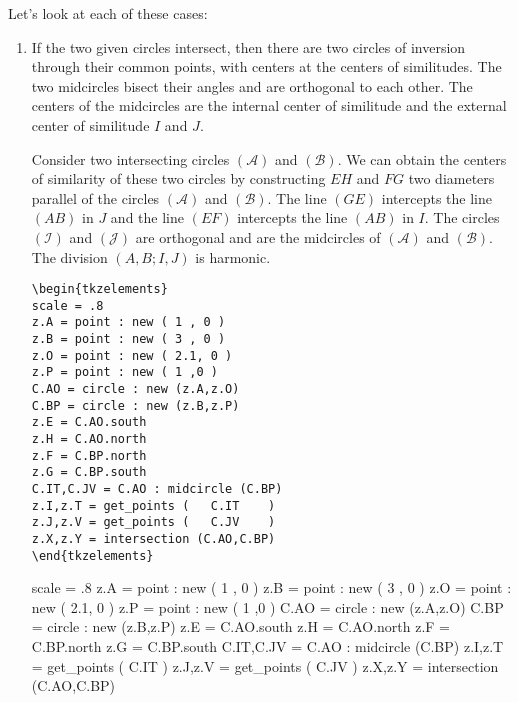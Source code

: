 Let's look at each of these cases:
\begin{enumerate}[label=(\roman*)]
\item If the two given circles intersect, then there are two  circles of inversion through their common points, with centers at the centers of similitudes.  The two midcircles bisect their angles and are orthogonal to each other. The centers of the midcircles are the internal center of similitude and the external center of similitude $I$ and $J$.

Consider two intersecting circles $(\mathcal{A})$ and $(\mathcal{B})$.
We can obtain the centers of similarity of these two circles by constructing $EH$ and $FG$ two diameters parallel of the circles $(\mathcal{A})$ and $(\mathcal{B})$. The  line $(GE)$ intercepts  the line $(AB)$ in $J$ and the line $(EF)$ intercepts the line $(AB)$ in $I$. The circles $(\mathcal{I})$ and $(\mathcal{J})$ are orthogonal and are the midcircles of $(\mathcal{A})$ and $(\mathcal{B})$. The division $(A,B;I,J)$ is harmonic.

\begin{minipage}{.4\textwidth}
\begin{verbatim}
\begin{tkzelements}
scale = .8
z.A = point : new ( 1 , 0 ) 
z.B = point : new ( 3 , 0 ) 
z.O = point : new ( 2.1, 0 ) 
z.P = point : new ( 1 ,0 ) 
C.AO = circle : new (z.A,z.O)
C.BP = circle : new (z.B,z.P)
z.E = C.AO.south
z.H = C.AO.north
z.F = C.BP.north
z.G = C.BP.south
C.IT,C.JV = C.AO : midcircle (C.BP)
z.I,z.T = get_points (   C.IT    ) 
z.J,z.V = get_points (   C.JV    ) 
z.X,z.Y = intersection (C.AO,C.BP)
\end{tkzelements}  
\end{verbatim}
\end{minipage}
\begin{minipage}{.6\textwidth}
   \begin{tkzelements}
   scale = .8
   z.A = point : new ( 1 , 0 ) 
   z.B = point : new ( 3 , 0 ) 
   z.O = point : new ( 2.1, 0 ) 
   z.P = point : new ( 1 ,0 ) 
   C.AO = circle : new (z.A,z.O)
   C.BP = circle : new (z.B,z.P)
   z.E = C.AO.south
   z.H = C.AO.north
   z.F = C.BP.north
   z.G = C.BP.south
   C.IT,C.JV = C.AO : midcircle (C.BP)
   z.I,z.T = get_points (   C.IT    ) 
   z.J,z.V = get_points (   C.JV    ) 
   z.X,z.Y = intersection (C.AO,C.BP)
   \end{tkzelements}
\end{minipage}



\end{enumerate}
